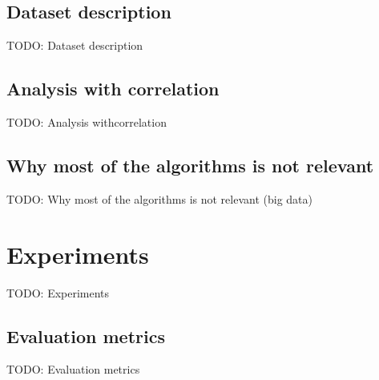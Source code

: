 \documentclass[11pt]{article}
\begin{document}
    \subsection{Dataset description}
      TODO: Dataset description
    \subsection{Analysis with correlation}
      TODO: Analysis withcorrelation
    \subsection{Why most of the algorithms is not relevant}
      TODO: Why most of the algorithms is not relevant (big data)
  \newpage
  \section{Experiments}
    TODO: Experiments
    \subsection{Evaluation metrics}
      TODO: Evaluation metrics
  \newpage
\end{document}

